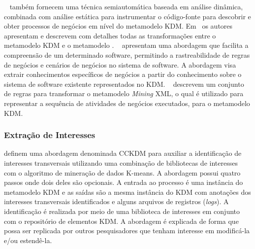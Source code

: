 ~ também fornecem uma técnica semiautomática baseada em análise dinâmica, combinada com análise estática para instrumentar o código-fonte para descobrir e obter processos de negócios em nível do metamodelo KDM. Em~\cite{Perez-Castillo:2010:IBP:1875847.1875861} os autores apresentam e descrevem com detalhes todas as transformações entre o metamodelo KDM e o metamodelo . ~ apresentam uma abordagem que facilita a compreensão de um determinado software, permitindo a rastreabilidade de regras de negócios e cenários de negócios no sistema de software. A abordagem visa extrair conhecimentos específicos de negócios a partir do conhecimento sobre o sistema de software existente representados no KDM. ~ descrevem um conjunto de regras para transformar o metamodelo \textit{Mining} XML, o qual é utilizado para representar a sequência de atividades de negócios executados, para o metamodelo KDM. 







\subsubsection{Extração de Interesses} %
\label{ssub:Concern Extracting}

 definem uma abordagem denominada CCKDM para auxiliar a identificação de interesses transversais utilizando uma combinação de bibliotecas de interesses com o algoritmo de mineração de dados K-means. A abordagem possui quatro passos onde dois deles são opcionais. A entrada ao processo é uma instância do metamodelo KDM e as saídas são a mesma instância do KDM com anotações dos interesses transversais identificados e alguns arquivos de registros (\textit{logs}). A identificação é realizada por meio de uma biblioteca de interesses em conjunto com o repositório de elementos KDM. A abordagem é explicada de forma que possa ser replicada por outros pesquisadores que tenham interesse em modificá-la e/ou estendê-la.

